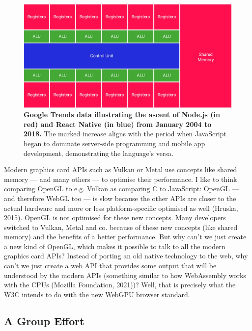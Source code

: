 \documentclass[10pt]{article}
\begin{document}
\begin{sloppypar}
  \begin{figure}[ht]
    \centering
    \includegraphics[width=\textwidth]{figures/shared-memory.png}
    \caption[Google Trends data illustrating the ascent of Node.js and React Native.]{\textbf{Google Trends data illustrating the ascent of Node.js (in red) and React Native (in blue) from January 2004 to 2018.} The marked increase aligns with the period when JavaScript began to dominate server-side programming and mobile app development, demonstrating the language’s versa.}
    \label{fig:shared-memory}
  \end{figure}

  Modern graphics card APIs such as Vulkan or Metal use concepts like shared memory — and many others — to optimise their performance. I like to think comparing OpenGL to e.g. Vulkan as comparing C to JavaScript: OpenGL — and therefore WebGL too — is slow because the other APIs are closer to the actual hardware and more or less platform-specific optimised as well (Hruska, 2015). OpenGL is not optimised for these new concepts. Many developers switched to Vulkan, Metal and co. because of these new concepts (like shared memory) and the benefits of a better performance. But why can’t we just create a new kind of OpenGL, which makes it possible to talk to all the modern graphics card APIs? Instead of porting an old native technology to the web, why can’t we just create a web API that provides some output that will be understood by the modern APIs (something similar to how WebAssembly works with the CPUs (Mozilla Foundation, 2021))? Well, that is precisely what the W3C intends to do with the new WebGPU browser standard.

  \subsection{A Group Effort}
  \label{subsec:a-group-effort}


\end{sloppypar}
\end{document}
